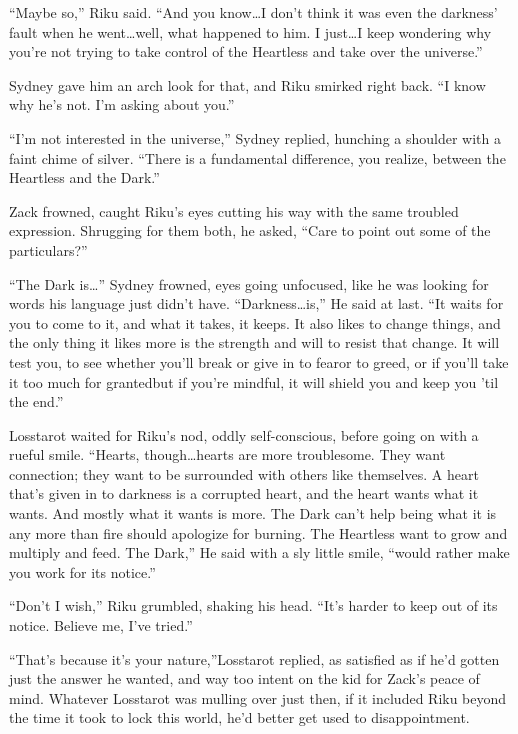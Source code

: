 ``Maybe so,'' Riku said. ``And you know\ldots I don't think it was even the darkness' fault when he went\ldots well, what happened to him. I just\ldots I keep wondering why you're not trying to take control of the Heartless and take over the universe.''

Sydney gave him an arch look for that, and Riku smirked right back. ``I know why he's not. I'm asking about you.''

``I'm not interested in the universe,'' Sydney replied, hunching a shoulder with a faint chime of silver. ``There is a fundamental difference, you realize, between the Heartless and the Dark.''

Zack frowned, caught Riku's eyes cutting his way with the same troubled expression. Shrugging for them both, he asked, ``Care to point out some of the particulars?''

``The Dark is\ldots'' Sydney frowned, eyes going unfocused, like he was looking for words his language just didn't have. ``Darkness\ldots is,'' He said at last. ``It waits for you to come to it, and what it takes, it keeps. It also likes to change things, and the only thing it likes more is the strength and will to resist that change. It will test you, to see whether you'll break or give in to fear\textemdash or to greed, or if you'll take it too much for granted\textemdash but if you're mindful, it will shield you and keep you 'til the end.''

Losstarot waited for Riku's nod, oddly self-conscious, before going on with a rueful smile. ``Hearts, though\ldots hearts are more troublesome. They want connection; they want to be surrounded with others like themselves. A heart that's given in to darkness is a corrupted heart, and the heart wants what it wants. And mostly what it wants is more. The Dark can't help being what it is any more than fire should apologize for burning. The Heartless want to grow and multiply and feed. The Dark,'' He said with a sly little smile, ``would rather make you work for its notice.''

``Don't I wish,'' Riku grumbled, shaking his head. ``It's harder to keep out of its notice. Believe me, I've tried.''

``That's because it's your nature,''Losstarot replied, as satisfied as if he'd gotten just the answer he wanted, and way too intent on the kid for Zack's peace of mind. Whatever Losstarot was mulling over just then, if it included Riku beyond the time it took to lock this world, he'd better get used to disappointment.

